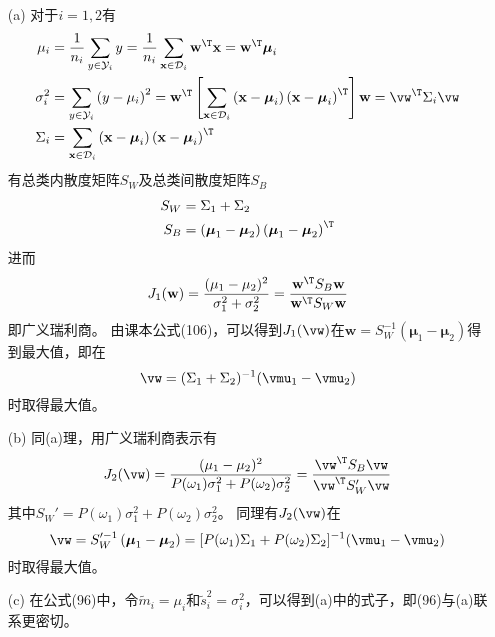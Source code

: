 \documentclass[reportComp]{thesis}
\begin{document}
\begin{answer}
\begin{itemize}
	\item [(a)] 对于$i=1,2$有
	\[\begin{aligned}
	\mu_{i} &=\frac{1}{n_{i}} \sum_{y \in \mathcal{Y}_{i}} y=\frac{1}{n_{i}} \sum_{\mathbf{x} \in \mathcal{D}_{i}} \mathbf{w}^{\T} \mathbf{x}=\mathbf{w}^{\T} \boldsymbol{\mu}_{i} \\
	\sigma_{i}^{2} &=\sum_{y \in \mathcal{Y}_{i}}\left(y-\mu_{i}\right)^{2}=\mathbf{w}^{\T}\left[\sum_{\mathbf{x} \in \mathcal{D}_{i}}\left(\mathbf{x}-\boldsymbol{\mu}_{i}\right)\left(\mathbf{x}-\boldsymbol{\mu}_{i}\right)^{\T}\right] \mathbf{w}=\vw^\T\Sigma_i\vw \\
	\Sigma_{i} &=\sum_{\mathbf{x} \in \mathcal{D}_{i}}\left(\mathbf{x}-\boldsymbol{\mu}_{i}\right)\left(\mathbf{x}-\boldsymbol{\mu}_{i}\right)^{\T}
	\end{aligned}\]
	有总类内散度矩阵$S_W$及总类间散度矩阵$S_B$
	\[\begin{aligned}
	S_W &=\Sigma_{1}+\Sigma_{2} \\
	S_B &=\left(\boldsymbol{\mu}_{1}-\boldsymbol{\mu}_{2}\right)\left(\boldsymbol{\mu}_{1}-\boldsymbol{\mu}_{2}\right)^{\T}
	\end{aligned}\]
	进而
	\[J_{1}(\mathbf{w})=\frac{(\mu_1-\mu_2)^2}{\sigma_1^2+\sigma_2^2}=\frac{\mathbf{w}^{\T} S_B \mathbf{w}}{\mathbf{w}^{\T} S_W \mathbf{w}}\]
	即广义瑞利商。
	由课本公式(106)，可以得到$J_1(\vw)$在$\mathbf{w}= S_W^{-1}\left(\boldsymbol{\mu}_{1}-\boldsymbol{\mu}_{2}\right)$得到最大值，即在
	\[\vw=(\Sigma_1+\Sigma_2)^{-1}(\vmu_1-\vmu_2)\]
	时取得最大值。
	\item [(b)] 同(a)理，用广义瑞利商表示有
	\[J_2(\vw)=\frac{(\mu_1-\mu_2)^2}{P(\omega_1)\sigma_1^2+P(\omega_2)\sigma_2^2}=
	\frac{\vw^\T S_B\vw}{\vw^\T S_W' \vw}\]
	其中$S_W'=P(\omega_1)\sigma_1^2+P(\omega_2)\sigma_2^2$。
	同理有$J_2(\vw)$在
	\[\vw=S_W'^{-1}\left(\boldsymbol{\mu}_{1}-\boldsymbol{\mu}_{2}\right)=
	[P(\omega_1)\Sigma_1+P(\omega_2)\Sigma_2]^{-1}(\vmu_1-\vmu_2)\]
	时取得最大值。
	\item [(c)] 在公式(96)中，令$\tilde{m}_i=\mu_i$和$\tilde{s}_i^2=\sigma_i^2$，可以得到(a)中的式子，即(96)与(a)联系更密切。
\end{itemize}
\end{answer}
\end{document}
